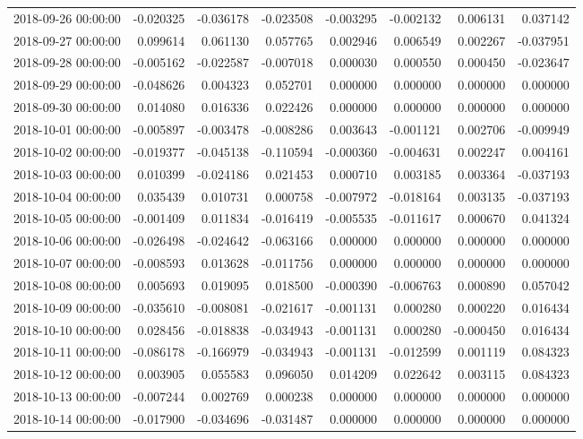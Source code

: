 \begin{tabular}{lrrrrrrr}
2018-09-26 00:00:00 & -0.020325 & -0.036178 & -0.023508 & -0.003295 & -0.002132 & 0.006131 & 0.037142 \\
2018-09-27 00:00:00 & 0.099614 & 0.061130 & 0.057765 & 0.002946 & 0.006549 & 0.002267 & -0.037951 \\
2018-09-28 00:00:00 & -0.005162 & -0.022587 & -0.007018 & 0.000030 & 0.000550 & 0.000450 & -0.023647 \\
2018-09-29 00:00:00 & -0.048626 & 0.004323 & 0.052701 & 0.000000 & 0.000000 & 0.000000 & 0.000000 \\
2018-09-30 00:00:00 & 0.014080 & 0.016336 & 0.022426 & 0.000000 & 0.000000 & 0.000000 & 0.000000 \\
2018-10-01 00:00:00 & -0.005897 & -0.003478 & -0.008286 & 0.003643 & -0.001121 & 0.002706 & -0.009949 \\
2018-10-02 00:00:00 & -0.019377 & -0.045138 & -0.110594 & -0.000360 & -0.004631 & 0.002247 & 0.004161 \\
2018-10-03 00:00:00 & 0.010399 & -0.024186 & 0.021453 & 0.000710 & 0.003185 & 0.003364 & -0.037193 \\
2018-10-04 00:00:00 & 0.035439 & 0.010731 & 0.000758 & -0.007972 & -0.018164 & 0.003135 & -0.037193 \\
2018-10-05 00:00:00 & -0.001409 & 0.011834 & -0.016419 & -0.005535 & -0.011617 & 0.000670 & 0.041324 \\
2018-10-06 00:00:00 & -0.026498 & -0.024642 & -0.063166 & 0.000000 & 0.000000 & 0.000000 & 0.000000 \\
2018-10-07 00:00:00 & -0.008593 & 0.013628 & -0.011756 & 0.000000 & 0.000000 & 0.000000 & 0.000000 \\
2018-10-08 00:00:00 & 0.005693 & 0.019095 & 0.018500 & -0.000390 & -0.006763 & 0.000890 & 0.057042 \\
2018-10-09 00:00:00 & -0.035610 & -0.008081 & -0.021617 & -0.001131 & 0.000280 & 0.000220 & 0.016434 \\
2018-10-10 00:00:00 & 0.028456 & -0.018838 & -0.034943 & -0.001131 & 0.000280 & -0.000450 & 0.016434 \\
2018-10-11 00:00:00 & -0.086178 & -0.166979 & -0.034943 & -0.001131 & -0.012599 & 0.001119 & 0.084323 \\
2018-10-12 00:00:00 & 0.003905 & 0.055583 & 0.096050 & 0.014209 & 0.022642 & 0.003115 & 0.084323 \\
2018-10-13 00:00:00 & -0.007244 & 0.002769 & 0.000238 & 0.000000 & 0.000000 & 0.000000 & 0.000000 \\
2018-10-14 00:00:00 & -0.017900 & -0.034696 & -0.031487 & 0.000000 & 0.000000 & 0.000000 & 0.000000 \\

\end{tabular}
